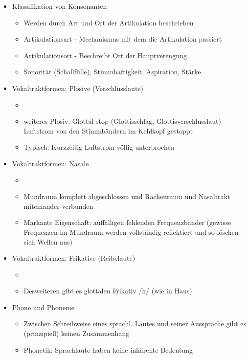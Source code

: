 \documentclass[a4paper,10pt,oneside]{article}
\begin{document}
\begin{itemize}
\begin{itemize}
			\end{itemize}
		\item Klassifikation von Konsonanten
			\begin{itemize}
				\item Werden durch Art und Ort der Artikulation beschrieben
				\item Artikulationsart - Mechanismus mit dem die Artikulation passiert
				\item Artikulationsort - Beschreibt Ort der Hauptverengung
				\item Sonorität (Schallfülle), Stimmhaftigkeit, Aspiration, Stärke
			\end{itemize}
		\item Vokaltraktformen: Plosive (Verschlusslaute)
			\begin{itemize}
				\item[] %
				\item weiteres Plosiv: Glottal stop (Glottisschlag, Glottisverschlusslaut) - Luftstrom von den Stimmbändern im Kehlkopf gestoppt 
				\item Typisch: Kurzzeitig Luftstrom völlig unterbrochen
			\end{itemize}
		\item Vokaltraktformen: Nasale
			\begin{itemize}
				\item[] %
				\item Mundraum komplett abgeschlossen und Rachenraum und Nasaltrakt miteinander verbunden
				\item Markante Eigenschaft: auffälligen fehlenden Frequenzbänder (gewisse Frequenzen im Mundraum werden vollständig reflektiert und so löschen sich Wellen aus)
			\end{itemize}
		\item Vokaltraktformen: Frikative (Reibelaute)
			\begin{itemize}
				\item[] %
				\item Desweiteren gibt es glottalen Frikativ /h/ (wie in Haus) 
			\end{itemize}
		\item Phone und Phoneme
			\begin{itemize}
				\item Zwischen Schreibweise eines sprachl. Lautes und seiner Aussprache gibt es (prinzipiell) keinen Zusammenhang
				\item Phonetik: Sprachlaute haben keine inhärente Bedeutung

\end{itemize}
\end{itemize}
\end{document}
